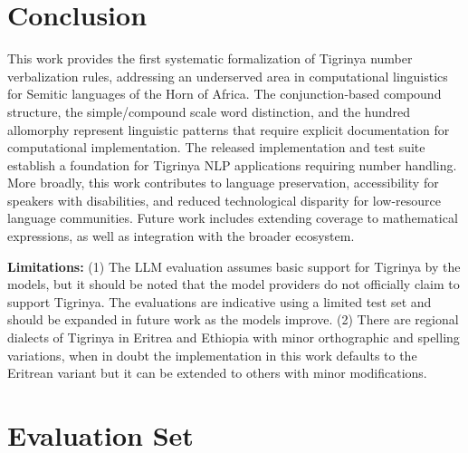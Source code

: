 \documentclass{article}
\begin{document}
\section{Conclusion}

This work provides the first systematic formalization of Tigrinya number verbalization rules, addressing an underserved area in computational linguistics for Semitic languages of the Horn of Africa. The conjunction-based compound structure, the simple/compound scale word distinction, and the hundred allomorphy represent linguistic patterns that require explicit documentation for computational implementation.
The released implementation and test suite establish a foundation for Tigrinya NLP applications requiring number handling. More broadly, this work contributes to language preservation, accessibility for speakers with disabilities, and reduced technological disparity for low-resource language communities. Future work includes extending coverage to mathematical expressions, as well as integration with the broader ecosystem.

\textbf{Limitations:} (1) The LLM evaluation assumes basic support for Tigrinya by the models, but it should be noted that the model providers do not officially claim to support Tigrinya. The evaluations are indicative using a limited test set and should be expanded in future work as the models improve. (2) There are regional dialects of Tigrinya in Eritrea and Ethiopia with minor orthographic and spelling variations, when in doubt the implementation in this work defaults to the Eritrean variant but it can be extended to others with minor modifications.




\newpage
\appendix
\section{Evaluation Set}
\label{appendix:eval}
\end{document}
